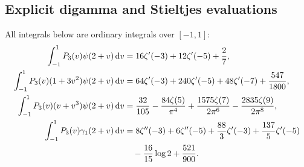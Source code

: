 \subsection{Explicit digamma and Stieltjes evaluations}
\begin{corollary}\label{cor:four-integrals}
All integrals below are ordinary integrals over $[-1,1]$:
\begin{align}
 \int_{-1}^1P_3(v)\psi(2+v)\,\mathrm d v
 &=16\zeta'(-3)+12\zeta'(-5)+\frac27,
 \label{eq:I-psi-base}\\
 \int_{-1}^1P_3(v)(1+3v^2)\psi(2+v)\,\mathrm d v
 &=64\zeta'(-3)+240\zeta'(-5)+48\zeta'(-7)
       +\frac{547}{1800},\label{eq:I-psi-mixed}\\
 \int_{-1}^1P_3(v)(v+v^3)\psi(2+v)\,\mathrm d v
 &=\frac{32}{105}-\frac{84\zeta(5)}{\pi^4}
   +\frac{1575\zeta(7)}{2\pi^6}-\frac{2835\zeta(9)}{2\pi^8},
 \label{eq:I-psi-odd}\\
 \int_{-1}^1P_3(v)\gamma_1(2+v)\,\mathrm d v
 &=8\zeta''(-3)+6\zeta''(-5)+\frac{88}{3}\zeta'(-3)
   +\frac{137}{5}\zeta'(-5)\notag\\
 &\hspace{1em}-\frac{16}{15}\log2+\frac{521}{900}.
 \label{eq:I-stieltjes}
\end{align}
\end{corollary}
